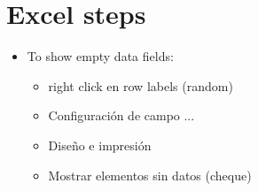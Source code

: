 \section{Excel steps}
\begin{itemize}
    \item To show empty data fields:
        \begin{itemize}[label=$\downarrow$]
           \item right click en row labels (random) 
           \item Configuración de campo ...  
           \item Diseño e impresión 
           \item Mostrar elementos sin datos (cheque)
        \end{itemize}
\end{itemize}
